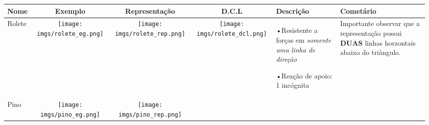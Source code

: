 \documentclass{article}
\begin{document}
\begin{table}[h]
    \begin{tabular}{|l|c|c|c|l|l|}\hline
        \textbf{Nome}                                               & \textbf{Exemplo} & \textbf{Representação} & \textbf{D.C.L} & \textbf{Descrição} & \textbf{Cometário} \\ \hline

        Rolete                                                      &

        \begin{minipage}{.2\textwidth}
            \centering
            \texttt{[image: imgs/rolete\_eg.png]}
        \end{minipage}      &

        \begin{minipage}{.2\columnwidth}
            \centering
            \texttt{[image: imgs/rolete\_rep.png]}
        \end{minipage}     &

        \begin{minipage}{.2\columnwidth}
            \centering
            \texttt{[image: imgs/rolete\_dcl.png]}
        \end{minipage}  &

        \begin{minipage}{.1\columnwidth}
            \tiny
            •Resistente a forças em \emph{somente uma linha de direção}

            •Reação de apoio: 1 incógnita
        \end{minipage} &

        \begin{minipage}{.1\columnwidth}
            \vspace{5px}
            \tiny
            Importante observar que a representação possui \textbf{DUAS} linhas horzontais abaixo do triângulo.
            \vspace{5px}
        \end{minipage}                                                                 \\ \hline

        Pino                                                        &

        \begin{minipage}{.2\textwidth}
            \centering
            \texttt{[image: imgs/pino\_eg.png]}
        \end{minipage}        &

        \begin{minipage}{.2\columnwidth}
            \centering
            \texttt{[image: imgs/pino\_rep.png]}
        \end{minipage}       &


\end{tabular}
\end{table}
\end{document}

